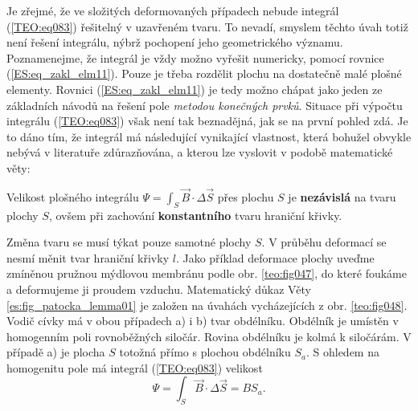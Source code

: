       Je zřejmé, že ve složitých deformovaných případech nebude integrál (\ref{TEO:eq083}) 
      řešitelný v uzavřeném tvaru. To nevadí, smyslem těchto úvah totiž není řešení integrálu, 
      nýbrž pochopení jeho geometrického významu. Poznamenejme, že integrál je vždy možno vyřešit 
      numericky, pomocí rovnice (\ref{ES:eq_zakl_elm11}). Pouze je třeba rozdělit plochu na 
      dostatečně malé plošné elementy. Rovnici (\ref{ES:eq_zakl_elm11}) je tedy možno chápat jako 
      jeden ze základních návodů na řešení pole \emph{metodou konečných prvků}. Situace při výpočtu 
      integrálu (\ref{TEO:eq083}) však není tak beznadějná, jak se na první pohled zdá. Je 
      to dáno tím, že integrál má následující vynikající vlastnost, která bohužel obvykle nebývá v 
      literatuře zdůrazňována, a kterou lze vyslovit v podobě matematické věty:
      \begin{lemma}\label{es:fig_patocka_lemma01}
        Velikost plošného integrálu \(\Psi = \int_S\vec{B}\cdot\Delta \vec{S}\) přes plochu \(S\) 
        je \textbf{nezávislá} na tvaru plochy \(S\), ovšem při zachování \textbf{konstantního} 
        tvaru hraniční křivky.
      \end{lemma}
      
      Změna tvaru se musí týkat pouze samotné plochy \(S\). V průběhu deformací se nesmí měnit tvar
      hraniční křivky \(l\). Jako příklad deformace plochy uveďme zmíněnou pružnou mýdlovou membránu
      podle obr. \ref{teo:fig047}, do které foukáme a deformujeme ji proudem vzduchu. Matematický
      důkaz Věty \ref{es:fig_patocka_lemma01} je založen na úvahách vycházejících z obr.
      \ref{teo:fig048}. Vodič cívky má v obou případech a) i b) tvar obdélníku. Obdélník je umístěn
      v homogenním poli rovnoběžných siločár. Rovina obdélníku je kolmá k siločárám. V případě a) je
      plocha \(S\) totožná přímo s plochou obdélníku \(S_a\). S ohledem na homogenitu pole má
      integrál (\ref{TEO:eq083}) velikost
      \begin{equation}\label{TEO:eq084}
        \Psi = \int_S\vec{B}\cdot\Delta \vec{S} = BS_a.
      \end{equation}

